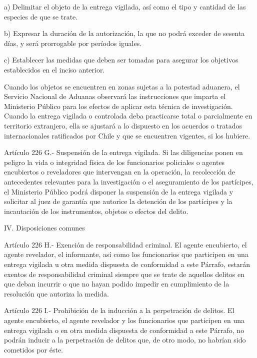     a) Delimitar el objeto de la entrega vigilada, así como el tipo y cantidad de las especies de que se trate.

    b) Expresar la duración de la autorización, la que no podrá exceder de sesenta días, y será prorrogable por períodos iguales.

    c) Establecer las medidas que deben ser tomadas para asegurar los objetivos establecidos en el inciso anterior.

    Cuando los objetos se encuentren en zonas sujetas a la potestad aduanera, el Servicio Nacional de Aduanas observará las instrucciones que imparta el Ministerio Público para los efectos de aplicar esta técnica de investigación.
    Cuando la entrega vigilada o controlada deba practicarse total o parcialmente en territorio extranjero, ella se ajustará a lo dispuesto en los acuerdos o tratados internacionales ratificados por Chile y que se encuentren vigentes, si los hubiere.

    Artículo 226 G.- Suspensión de la entrega vigilada. Si las diligencias ponen en peligro la vida o integridad física de los funcionarios policiales o agentes encubiertos o reveladores que intervengan en la operación, la recolección de antecedentes relevantes para la investigación o el aseguramiento de los partícipes, el Ministerio Público podrá disponer la suspensión de la entrega vigilada y solicitar al juez de garantía que autorice la detención de los partícipes y la incautación de los instrumentos, objetos o efectos del delito.

    IV. Disposiciones comunes



    Artículo 226 H.- Exención de responsabilidad criminal. El agente encubierto, el agente revelador, el informante, así como los funcionarios que participen en una entrega vigilada u otra medida dispuesta de conformidad a este Párrafo, estarán exentos de responsabilidad criminal siempre que se trate de aquellos delitos en que deban incurrir o que no hayan podido impedir en cumplimiento de la resolución que autoriza la medida.

    Artículo 226 I.- Prohibición de la inducción a la perpetración de delitos. El agente encubierto, el agente revelador y los funcionarios que participen en una entrega vigilada o en otra medida dispuesta de conformidad a este Párrafo, no podrán inducir a la perpetración de delitos que, de otro modo, no habrían sido cometidos por éste.

